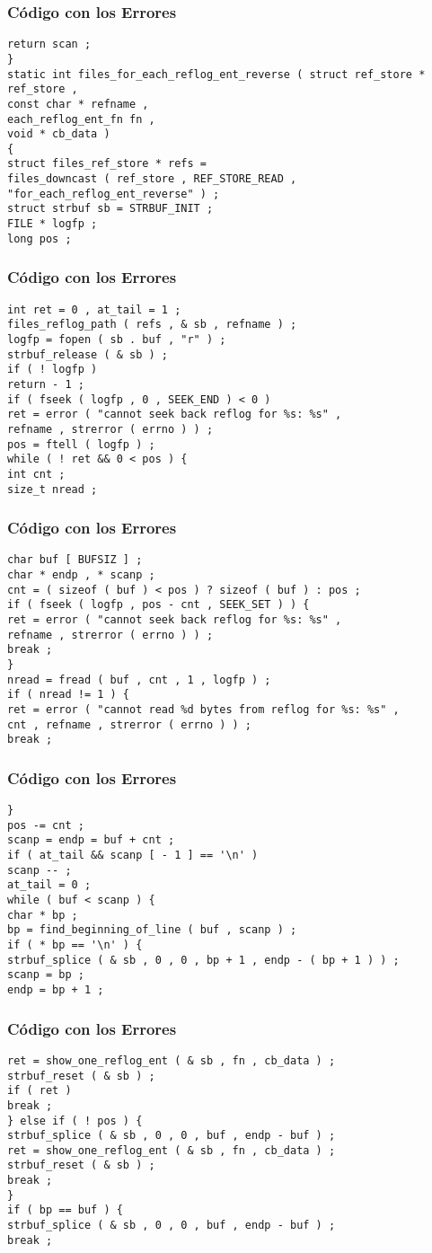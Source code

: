 \documentclass{beamer}
\begin{document}
\begin{frame}[fragile]
\frametitle{C\'odigo con los Errores}
\begin{verbatim}
return scan ; 
} 
static int files_for_each_reflog_ent_reverse ( struct ref_store * ref_store , 
const char * refname , 
each_reflog_ent_fn fn , 
void * cb_data ) 
{ 
struct files_ref_store * refs = 
files_downcast ( ref_store , REF_STORE_READ , 
"for_each_reflog_ent_reverse" ) ; 
struct strbuf sb = STRBUF_INIT ; 
FILE * logfp ; 
long pos ; 
\end{verbatim}
\end{frame}
\begin{frame}[fragile]
\frametitle{C\'odigo con los Errores}
\begin{verbatim}
int ret = 0 , at_tail = 1 ; 
files_reflog_path ( refs , & sb , refname ) ; 
logfp = fopen ( sb . buf , "r" ) ; 
strbuf_release ( & sb ) ; 
if ( ! logfp ) 
return - 1 ; 
if ( fseek ( logfp , 0 , SEEK_END ) < 0 ) 
ret = error ( "cannot seek back reflog for %s: %s" , 
refname , strerror ( errno ) ) ; 
pos = ftell ( logfp ) ; 
while ( ! ret && 0 < pos ) { 
int cnt ; 
size_t nread ; 
\end{verbatim}
\end{frame}
\begin{frame}[fragile]
\frametitle{C\'odigo con los Errores}
\begin{verbatim}
char buf [ BUFSIZ ] ; 
char * endp , * scanp ; 
cnt = ( sizeof ( buf ) < pos ) ? sizeof ( buf ) : pos ; 
if ( fseek ( logfp , pos - cnt , SEEK_SET ) ) { 
ret = error ( "cannot seek back reflog for %s: %s" , 
refname , strerror ( errno ) ) ; 
break ; 
} 
nread = fread ( buf , cnt , 1 , logfp ) ; 
if ( nread != 1 ) { 
ret = error ( "cannot read %d bytes from reflog for %s: %s" , 
cnt , refname , strerror ( errno ) ) ; 
break ; 
\end{verbatim}
\end{frame}
\begin{frame}[fragile]
\frametitle{C\'odigo con los Errores}
\begin{verbatim}
} 
pos -= cnt ; 
scanp = endp = buf + cnt ; 
if ( at_tail && scanp [ - 1 ] == '\n' ) 
scanp -- ; 
at_tail = 0 ; 
while ( buf < scanp ) { 
char * bp ; 
bp = find_beginning_of_line ( buf , scanp ) ; 
if ( * bp == '\n' ) { 
strbuf_splice ( & sb , 0 , 0 , bp + 1 , endp - ( bp + 1 ) ) ; 
scanp = bp ; 
endp = bp + 1 ; 
\end{verbatim}
\end{frame}
\begin{frame}[fragile]
\frametitle{C\'odigo con los Errores}
\begin{verbatim}
ret = show_one_reflog_ent ( & sb , fn , cb_data ) ; 
strbuf_reset ( & sb ) ; 
if ( ret ) 
break ; 
} else if ( ! pos ) { 
strbuf_splice ( & sb , 0 , 0 , buf , endp - buf ) ; 
ret = show_one_reflog_ent ( & sb , fn , cb_data ) ; 
strbuf_reset ( & sb ) ; 
break ; 
} 
if ( bp == buf ) { 
strbuf_splice ( & sb , 0 , 0 , buf , endp - buf ) ; 
break ; 
\end{verbatim}
\end{frame}
\end{document}
